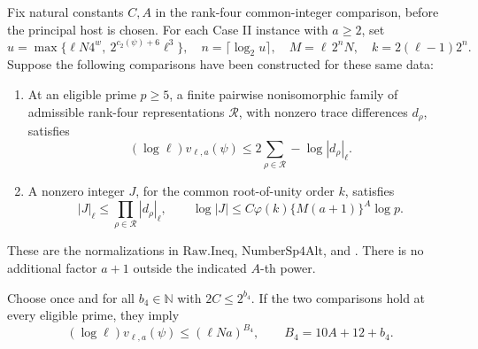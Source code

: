 \begin{srproposition}
\label{prop:sr-rank-four-absorption}
Fix natural constants \(C,A\) in the rank-four common-integer
comparison, before the principal host is chosen.
For each Case II instance with \(a\geq2\), set
\[
 u=\max\{\ell N4^w,\ 2^{c_2(\psi)+6}\ell^3\},\quad
 n=\lceil\log_2u\rceil,\quad
 M=\ell\,2^nN,\quad k=2(\ell-1)2^n.
\]
Suppose the following comparisons have been constructed for these
same data:
\begin{enumerate}
\item At an eligible prime \(p\geq5\), a finite pairwise nonisomorphic
family of admissible rank-four representations \(\mathcal R\), with
nonzero trace differences \(d_\rho\), satisfies
\[
 (\log\ell)v_{\ell,a}(\psi)
                  \leq2\sum_{\rho\in\mathcal R}-\log|d_\rho|_\ell .
\]
\item A nonzero integer \(J\), for the common root-of-unity order \(k\),
satisfies
\[
 |J|_\ell\leq\prod_{\rho\in\mathcal R}|d_\rho|_\ell,\qquad
 \log|J|\leq C\varphi(k)\{M(a+1)\}^{A}\log p.
\]
\end{enumerate}
These are the normalizations in
\(\mathrm{Raw.Ineq}\), \(\mathrm{NumberSp4Alt}\), and
.
There is no additional factor \(a+1\) outside the indicated \(A\)-th
power.

Choose once and for all \(b_4\in\mathbb N\) with \(2C\leq2^{b_4}\).
If the two comparisons hold at every eligible prime, they imply
\[
 (\log\ell)v_{\ell,a}(\psi)\leq(\ell Na)^{B_4},\qquad
                         B_4=10A+12+b_4 .
\]
\end{srproposition}
